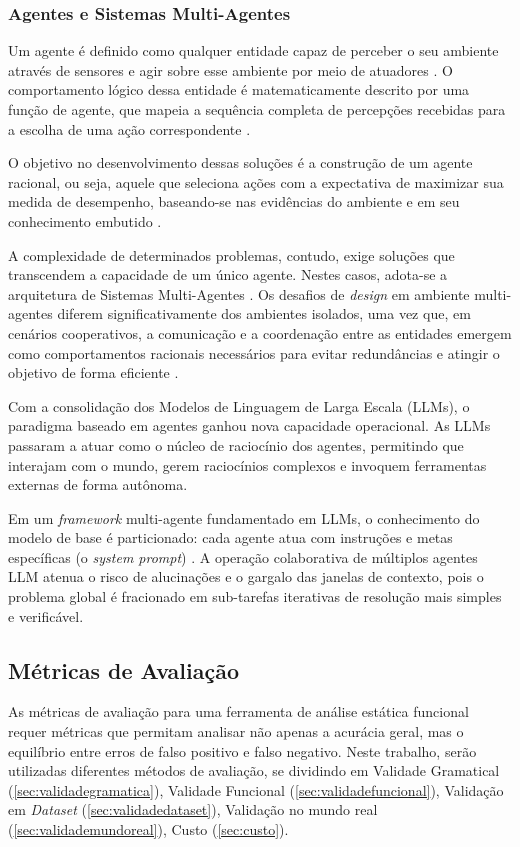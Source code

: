 \documentclass[
    12pt,                %
    openright,           %
    oneside,             %
    a4paper,             %
    english,             %
    brazil               %
]{abntex2}
\begin{document}
\subsubsection{Agentes e Sistemas Multi-Agentes}
\label{sec:agentes}
\par
Um agente é definido como qualquer entidade capaz de perceber o seu ambiente através de sensores e agir sobre esse ambiente por meio de atuadores \cite{russell2020artificial}.
O comportamento lógico dessa entidade é matematicamente descrito por uma função de agente, que mapeia a sequência completa de percepções recebidas para a escolha de uma ação correspondente \cite{russell2020artificial}.
\par
O objetivo no desenvolvimento dessas soluções é a construção de um agente racional, ou seja, aquele que seleciona ações com a expectativa de maximizar sua medida de desempenho, baseando-se nas evidências do ambiente e em seu conhecimento embutido \cite{russell2020artificial}.
\par
A complexidade de determinados problemas, contudo, exige soluções que transcendem a capacidade de um único agente.
Nestes casos, adota-se a arquitetura de Sistemas Multi-Agentes \cite{russell2020artificial}.
Os desafios de \textit{design} em ambiente multi-agentes diferem significativamente dos ambientes isolados, uma vez que, em cenários cooperativos, a comunicação e a coordenação entre as entidades emergem como comportamentos racionais necessários para evitar redundâncias e atingir o objetivo de forma eficiente \cite{russell2020artificial}.
\par
Com a consolidação dos Modelos de Linguagem de Larga Escala (LLMs), o paradigma baseado em agentes ganhou nova capacidade operacional.
As LLMs passaram a atuar como o núcleo de raciocínio dos agentes, permitindo que interajam com o mundo, gerem raciocínios complexos e invoquem ferramentas externas de forma autônoma.
\par
Em um \textit{framework} multi-agente fundamentado em LLMs, o conhecimento do modelo de base é particionado: cada agente atua com instruções e metas específicas (o \textit{system prompt}) \cite{russell2020artificial}.
A operação colaborativa de múltiplos agentes LLM atenua o risco de alucinações e o gargalo das janelas de contexto, pois o problema global é fracionado em sub-tarefas iterativas de resolução mais simples e verificável.

\subsection{Métricas de Avaliação}
\label{sec:metricasavaliacao}
\par
As métricas de avaliação para uma ferramenta de análise estática funcional requer métricas que permitam analisar não apenas a acurácia geral, mas o equilíbrio entre erros de falso positivo e falso negativo. 
Neste trabalho, serão utilizadas diferentes métodos de avaliação, se dividindo em Validade Gramatical (\ref{sec:validadegramatica}), Validade Funcional (\ref{sec:validadefuncional}), Validação em \textit{Dataset} (\ref{sec:validadedataset}), Validação no mundo real (\ref{sec:validademundoreal}), Custo (\ref{sec:custo}).
\end{document}
